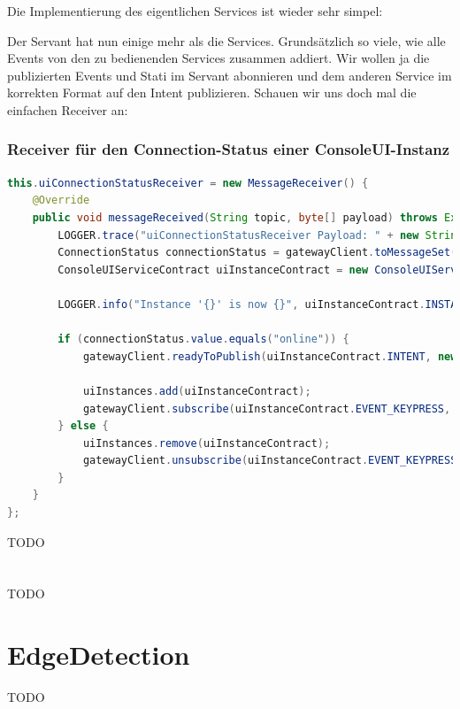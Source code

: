 Die Implementierung des eigentlichen Services ist wieder sehr simpel:


Der Servant hat nun einige  mehr als die Services. Grundsätzlich so viele, wie alle Events von den zu bedienenden Services zusammen addiert. Wir wollen ja die publizierten Events und Stati im Servant abonnieren und dem anderen Service im korrekten Format auf den Intent publizieren.
Schauen wir uns doch mal die einfachen Receiver an:
\subsubsection{Receiver für den Connection-Status einer ConsoleUI-Instanz}
\begin{lstlisting}[language=Java,caption={MessageReceiver für die Connection-Status einer ConsoleUI-Instanz},label={lst:servant-uiConnectionStatusReceiver}]
this.uiConnectionStatusReceiver = new MessageReceiver() {
    @Override
    public void messageReceived(String topic, byte[] payload) throws Exception {
        LOGGER.trace("uiConnectionStatusReceiver Payload: " + new String(payload));
        ConnectionStatus connectionStatus = gatewayClient.toMessageSet(payload, ConnectionStatus.class).last();
        ConsoleUIServiceContract uiInstanceContract = new ConsoleUIServiceContract(topic, true);

        LOGGER.info("Instance '{}' is now {}", uiInstanceContract.INSTANCE, connectionStatus.value);

        if (connectionStatus.value.equals("online")) {
            gatewayClient.readyToPublish(uiInstanceContract.INTENT, new ConsoleIntent("This is a message from the Servant, we now have a connection together.") );

            uiInstances.add(uiInstanceContract);
            gatewayClient.subscribe(uiInstanceContract.EVENT_KEYPRESS, keyPressReceiver);
        } else {
            uiInstances.remove(uiInstanceContract);
            gatewayClient.unsubscribe(uiInstanceContract.EVENT_KEYPRESS);
        }
    }
};
\end{lstlisting}

TODO
\section{}
TODO
\label{chap:tim-mock}

\section{EdgeDetection}
TODO

